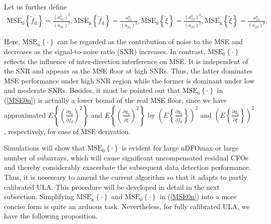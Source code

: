\documentclass[12pt, draftclsnofoot, onecolumn]{IEEEtran}
\begin{document}
Let us further define
\begin{align}\label{MSE0n}
\text{MS}{{\text{E}}_{0}}\left\{ {{{\tilde{f}}}_{d}} \right\}=\frac{\left( a_{11}^{0} \right)^2}{\left( a_{21} \right)^{2}}, \text{MS}{{\text{E}}_{\mathrm{n}}}\left\{ {{{\tilde{f}}}_{d}} \right\}=\frac{a_{11}^{\mathrm{n}}}{\left( a_{21} \right)^{2}}, \text{MS}{{\text{E}}_{0}}\left\{ {{{\tilde{\xi}}}} \right\}=\frac{\left( a_{12}^{0} \right)^2}{\left( a_{23} \right)^{2}}, \text{MS}{{\text{E}}_{\mathrm{n}}}\left\{ {{{\tilde{\xi}}}} \right\}=\frac{a_{12}^{\mathrm{n}}}{\left( a_{23} \right)^{2}}.
\end{align}

Here, ${{\text{MSE}}_{\mathrm{n}}}\left\{ \cdot \right\}$ can be regarded as the contribution of noise to the MSE and decreases as the signal-to-noise ratio (SNR) increases. In contrast, ${{\text{MSE}}_{0}}\left\{ \cdot \right\}$ reflects the influence of inter-direction interference on MSE.
It is independent of the SNR and appears as the MSE floor at high SNRs.
Thus, the latter dominates MSE performance under high SNR region while the former is dominant under low and moderate SNRs. Besides, it must be pointed out that ${{\text{MSE}}_{0}}\left\{ \cdot \right\}$ in (\ref{MSE0n}) is actually a lower bound of the real MSE floor, since we have approximated ${E\left\{ {{\left( \frac{\partial {{g}_{0}}}{\partial {{{\tilde{f}}}_{d}}} \right)}^{2}} \right\}}$ and ${E\left\{ {{\left( \frac{\partial {{g}_{0}}}{\partial {{{\tilde{\xi}}}}} \right)}^{2}} \right\}}$ by $\left( {E\left\{ {\frac{\partial {{g}_{0}}}{\partial {{{\tilde{f}}}_{d}}} } \right\}} \right)^{2}$ and $\left( {E\left\{ {\frac{\partial {{g}_{0}}}{\partial {{{\tilde{\xi}}}}} } \right\}} \right)^{2}$, respectively, for ease of MSE derivation.

Simulations will show that ${{\text{MSE}}_{0}}\left\{ \cdot \right\}$ is evident for large nDFOmax or large number of subarrays, which will cause significant uncompensated residual CFOs and thereby considerably exacerbate the subsequent data detection performance. Thus, it is necessary to amend the current algorithm so that it adapts to partly calibrated ULA. This procedure will be developed in detail in the next subsection.
Simplifying ${{\text{MSE}}_{\mathrm{n}}} \left\{ \cdot \right\}$ and ${{\text{MSE}}_{0}} \left\{ \cdot \right\}$ in (\ref{MSE0n}) into a more concise form is quite an arduous task. Nevertheless, for fully calibrated ULA, we have the following proposition.
\end{document}
